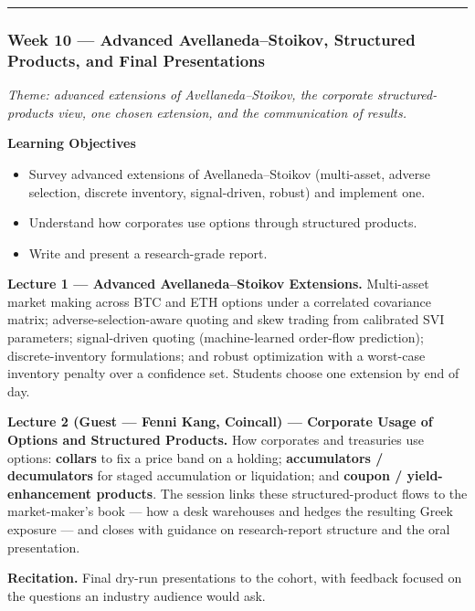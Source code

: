 \documentclass[
]{article}
\providecommand{\tightlist}{%
  \setlength{\itemsep}{0pt}\setlength{\parskip}{0pt}}
\begin{document}
\begin{center}\rule{0.5\linewidth}{0.5pt}\end{center}

\subsubsection{Week 10 --- Advanced Avellaneda--Stoikov, Structured
Products, and Final
Presentations}\label{week-10-advanced-avellanedastoikov-structured-products-and-final-presentations}

\emph{Theme: advanced extensions of Avellaneda--Stoikov, the corporate
structured-products view, one chosen extension, and the communication of
results.}

\textbf{Learning Objectives}

\begin{itemize}
\tightlist
\item
  Survey advanced extensions of Avellaneda--Stoikov (multi-asset,
  adverse selection, discrete inventory, signal-driven, robust) and
  implement one.
\item
  Understand how corporates use options through structured products.
\item
  Write and present a research-grade report.
\end{itemize}

\textbf{Lecture 1 --- Advanced Avellaneda--Stoikov Extensions.}
Multi-asset market making across BTC and ETH options under a correlated
covariance matrix; adverse-selection-aware quoting and skew trading from
calibrated SVI parameters; signal-driven quoting (machine-learned
order-flow prediction); discrete-inventory formulations; and robust
optimization with a worst-case inventory penalty over a confidence set.
Students choose one extension by end of day.

\textbf{Lecture 2 (Guest --- Fenni Kang, Coincall) --- Corporate Usage
of Options and Structured Products.} How corporates and treasuries use
options: \textbf{collars} to fix a price band on a holding;
\textbf{accumulators / decumulators} for staged accumulation or
liquidation; and \textbf{coupon / yield-enhancement products}. The
session links these structured-product flows to the market-maker's book
--- how a desk warehouses and hedges the resulting Greek exposure ---
and closes with guidance on research-report structure and the oral
presentation.

\textbf{Recitation.} Final dry-run presentations to the cohort, with
feedback focused on the questions an industry audience would ask.
\end{document}
